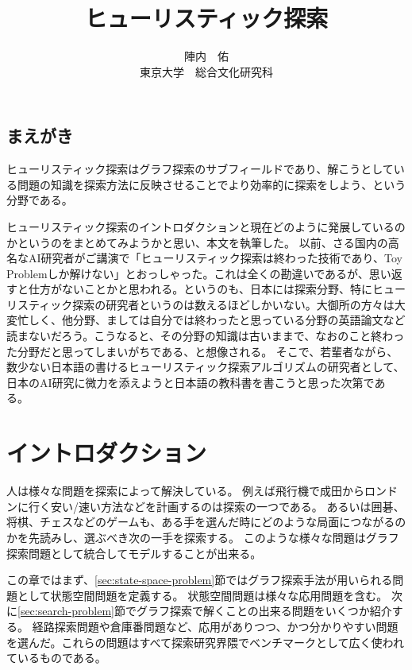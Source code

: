 \documentclass{report}
\title{ヒューリスティック探索}
\author{陣内　佑 \\
東京大学　総合文化研究科}
\begin{document}
\maketitle

\tableofcontents
\newpage

\section*{まえがき}
ヒューリスティック探索はグラフ探索のサブフィールドであり、解こうとしている問題の知識を探索方法に反映させることでより効率的に探索をしよう、という分野である。

ヒューリスティック探索のイントロダクションと現在どのように発展しているのかというのをまとめてみようかと思い、本文を執筆した。
以前、さる国内の高名なAI研究者がご講演で「ヒューリスティック探索は終わった技術であり、Toy Problemしか解けない」とおっしゃった。これは全くの勘違いであるが、思い返すと仕方がないことかと思われる。というのも、日本には探索分野、特にヒューリスティック探索の研究者というのは数えるほどしかいない。大御所の方々は大変忙しく、他分野、ましては自分では終わったと思っている分野の英語論文など読まないだろう。こうなると、その分野の知識は古いままで、なおのこと終わった分野だと思ってしまいがちである、と想像される。
そこで、若輩者ながら、数少ない日本語の書けるヒューリスティック探索アルゴリズムの研究者として、日本のAI研究に微力を添えようと日本語の教科書を書こうと思った次第である。


\chapter{イントロダクション}
\label{ch:introduction}

人は様々な問題を探索によって解決している。
例えば飛行機で成田からロンドンに行く安い/速い方法などを計画するのは探索の一つである。
あるいは囲碁、将棋、チェスなどのゲームも、ある手を選んだ時にどのような局面につながるのかを先読みし、選ぶべき次の一手を探索する。
このような様々な問題はグラフ探索問題として統合してモデルすることが出来る。


この章ではまず、\ref{sec:state-space-problem}節ではグラフ探索手法が用いられる問題として状態空間問題を定義する。
状態空間問題は様々な応用問題を含む。
次に\ref{sec:search-problem}節でグラフ探索で解くことの出来る問題をいくつか紹介する。
経路探索問題や倉庫番問題など、応用がありつつ、かつ分かりやすい問題を選んだ。これらの問題はすべて探索研究界隈でベンチマークとして広く使われているものである。
\end{document}
